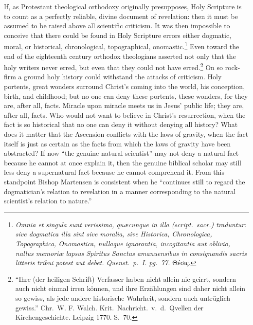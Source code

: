 \documentclass[12pt]{book}
\newcommand{\opage}[1]{\marginnote{\footnotesize\textit{[#1]}}}
\begin{document}
If, as Protestant theological orthodoxy originally presupposes, Holy Scripture is to count as a perfectly reliable, divine document of revelation: then it must be assumed to be raised above all scientific criticism. It was then impossible to conceive that there could be found in Holy Scripture errors either dogmatic, moral, or historical, chronological, topographical, onomastic.\footnote{\textit{Omnia et singula sunt verissima, quæcunque in illa (script.\ sacr.) traduntur: sive dogmatica illa sint sive moralia, sive Historica, Chronologica, Topographica, Onomastica, nullaque ignorantia, incogitantia aut oblivio, nullus memoriæ lapsus Spiritus Sanctus
amanuensibus in consignandis sacris litteris tribui potest aut debet. Quenst.\ p.\ I. pg.\ 77.} Θέσις.} Even toward the end of the eighteenth century orthodox theologians asserted not only that the holy writers never erred, but even that they could not have erred.\footnote{``Ihre (der heiligen Schrift) Verfasser haben nicht allein nie geirrt, sondern auch nicht einmal irren können, und ihre Erzählungen sind daher nicht allein so gewiss, als jede andere historische Wahrheit, sondern auch untrüglich gewiss.'' Chr.\ W. F. Walch. Krit.\ Nachricht.\ v.\ d.\ Qvellen der Kirchengeschichte. Leipzig 1770. S.~70.} On so rock-firm a ground holy history could withstand the attacks of criticism. Holy portents, great wonders surround Christ's coming into the world, his conception, birth, and childhood; but no one can deny these portents, these
\opage{47}\setcounter{footnote}{0}%
wonders, for they are, after all, facts. Miracle upon miracle meets us in Jesus' public life; they are, after all, facts. Who would not want to believe in Christ's resurrection, when the fact is so historical that no one can deny it without denying all history? What does it matter that the Ascension conflicts with the laws of gravity, when the fact itself is just as certain as the facts from which the laws of gravity have been abstracted? If now ``the genuine natural scientist'' may not deny a natural fact because he cannot at once explain it, then the genuine biblical scholar may still less deny a supernatural fact because he cannot comprehend it. From this standpoint Bishop Martensen is consistent when he ``continues still to regard the dogmatician's relation to revelation in a manner corresponding to the natural scientist's relation to nature.''
\end{document}
